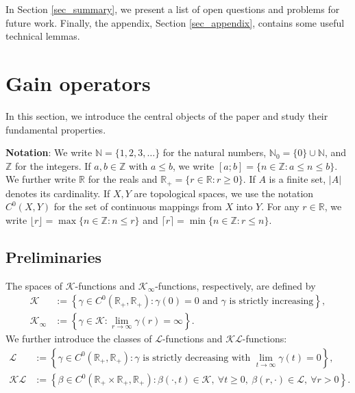 \documentclass[10pt, oneside, a4paper]{article}
\newcommand{\N}{\mathbb{N}}
\newcommand{\Z}{\mathbb{Z}}
\newcommand{\R}{\mathbb{R}}
\newcommand{\tm}{\times}
\newcommand{\KC}{\mathcal{K}}
\newcommand{\LC}{\mathcal{L}}
\begin{document}
In Section \ref{sec_summary}, we present a list of open questions and problems for future work. Finally, the appendix, Section \ref{sec_appendix}, contains some useful technical lemmas.

\section{Gain operators}\label{sec_gain_ops}

In this section, we introduce the central objects of the paper and study their fundamental properties.%

{\bf Notation}: We write $\N = \{1,2,3,\ldots\}$ for the natural numbers, $\N_0 = \{0\} \cup \N$, and $\Z$ for the integers. If $a,b \in \Z$ with $a \leq b$, we write $[a;b] = \{ n \in \Z : a \leq n \leq b \}$. We further write $\R$ for the reals and $\R_+ = \{ r \in \R : r \geq 0 \}$. If $A$ is a finite set, $|A|$ denotes its cardinality. If $X,Y$ are topological spaces, we use the notation $C^0(X,Y)$ for the set of continuous mappings from $X$ into $Y$. For any $r \in \R$, we write $\lfloor r \rfloor = \max\{ n \in \Z : n \leq r \}$ and $\lceil r \rceil = \min\{ n \in \Z : r \leq n \}$.%

\subsection{Preliminaries}\label{subsec_prelim}

The spaces of $\KC$-functions and $\KC_{\infty}$-functions, respectively, are defined by%
\begin{align*}
  \KC &:= \left\{ \gamma \in C^0(\R_+,\R_+) : \gamma(0) = 0 \mbox{ and } \gamma \mbox{ is strictly increasing} \right\}, \\
  \KC_{\infty} &:= \left\{ \gamma \in \KC : \lim_{r \rightarrow \infty}\gamma(r) = \infty \right\}.%
\end{align*}
We further introduce the classes of $\LC$-functions and $\KC\LC$-functions:%
\begin{align*}
  \LC &:= \left\{ \gamma \in C^0(\R_+,\R_+) : \gamma \mbox{ is strictly decreasing with } \lim_{t\rightarrow\infty}\gamma(t) = 0 \right\}, \\
	\KC\LC &:= \left\{ \beta \in C^0(\R_+ \tm \R_+,\R_+) : \beta(\cdot,t) \in \KC,\ \forall t\geq0,\ \beta(r,\cdot) \in \LC,\ \forall r>0 \right\}.%
\end{align*}
\end{document}
